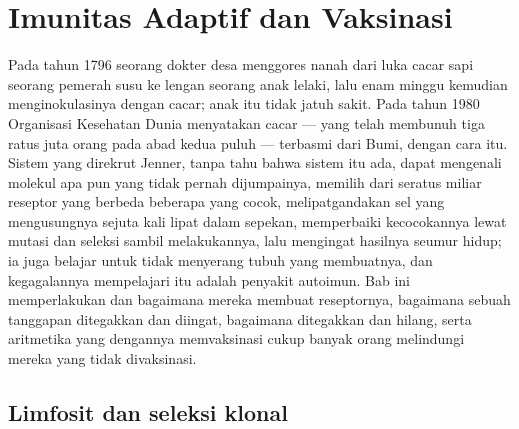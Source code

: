 \chapter{Imunitas Adaptif dan Vaksinasi}\label{ch:b3:adaptive-immunity}

Pada tahun 1796 seorang dokter desa menggores nanah dari luka cacar sapi
seorang pemerah susu ke lengan seorang anak lelaki, lalu enam minggu kemudian
menginokulasinya dengan cacar; anak itu tidak jatuh sakit. Pada tahun 1980
Organisasi Kesehatan Dunia menyatakan cacar --- yang telah membunuh tiga ratus
juta orang pada abad kedua puluh --- terbasmi dari Bumi, dengan cara itu.
Sistem yang direkrut Jenner, tanpa tahu bahwa sistem itu ada, dapat
mengenali molekul apa pun yang tidak pernah dijumpainya, memilih dari seratus
miliar reseptor yang berbeda beberapa yang cocok, melipatgandakan sel yang
mengusungnya sejuta kali lipat dalam sepekan, memperbaiki kecocokannya lewat
mutasi dan seleksi sambil melakukannya, lalu mengingat hasilnya seumur hidup; ia
juga belajar untuk tidak menyerang tubuh yang membuatnya, dan kegagalannya
mempelajari itu adalah penyakit autoimun. Bab ini memperlakukan
 dan bagaimana mereka membuat reseptornya, bagaimana sebuah tanggapan
ditegakkan dan diingat, bagaimana  ditegakkan dan hilang, serta
aritmetika yang dengannya memvaksinasi cukup banyak orang melindungi mereka yang
tidak divaksinasi.

\section{Limfosit dan seleksi klonal}

